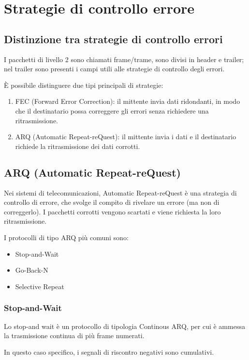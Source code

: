 \section{Strategie di controllo errore}
\subsection{Distinzione tra strategie di controllo errori}
I pacchetti di livello 2 sono chiamati frame/trame, sono divisi in header e trailer; nel trailer sono presenti i campi utili alle strategie di controllo degli errori.

È possibile distinguere due tipi principali di strategie:
\begin{enumerate}
    \item FEC (Forward Error Correction): il mittente invia dati ridondanti, in modo che il destinatario possa correggere gli errori senza richiedere una ritrasmissione.
    \item ARQ (Automatic Repeat-reQuest): il mittente invia i dati e il destinatario richiede la ritrasmissione dei dati corrotti. 
\end{enumerate}
\subsection{ARQ (Automatic Repeat-reQuest)}
Nei sistemi di telecomunicazioni, Automatic Repeat-reQuest è una strategia di controllo di errore, che svolge il compito di rivelare un errore (ma non di correggerlo). I pacchetti corrotti vengono scartati e viene richiesta la loro ritrasmissione.

I protocolli di tipo ARQ più comuni sono:
\begin{itemize}
    \item Stop-and-Wait 
    \item Go-Back-N 
    \item Selective Repeat
\end{itemize}


\newpage
\subsubsection{Stop-and-Wait}
Lo stop-and wait è un protocollo di tipologia Continous ARQ, per cui è ammessa la trasmissione continua di più frame numerati.

In questo caso specifico, i segnali di riscontro negativi sono cumulativi.

